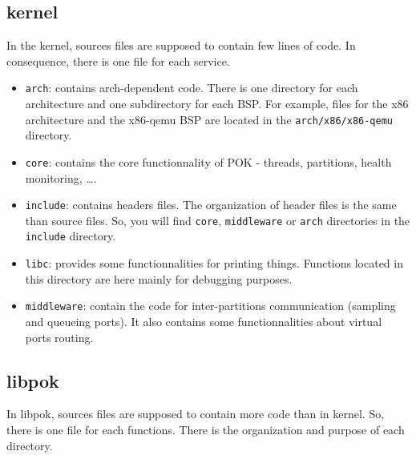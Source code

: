 \documentclass[oneside]{article}
\begin{document}
   \subsection{kernel}
   In the kernel, sources files are supposed to contain few lines of code. In
   consequence, there is one file for each service.
   \begin{itemize}
      \item
         \texttt{arch}: contains arch-dependent code. There is one directory for
         each architecture and one subdirectory for each BSP. For example, files
         for the x86 architecture and the x86-qemu BSP are located in the
         \texttt{arch/x86/x86-qemu} directory.
      \item
         \texttt{core}: contains the core functionnality of POK - threads,
         partitions, health monitoring, \ldots.
      \item
         \texttt{include}: contains headers files. The organization of header
         files is the same than source files. So, you will find \texttt{core},
         \texttt{middleware} or \texttt{arch} directories in the
         \texttt{include} directory.
      \item
         \texttt{libc}: provides some functionnalities for printing things.
         Functions located in this directory are here mainly for debugging
         purposes.
      \item
         \texttt{middleware}: contain the code for inter-partitions
         communication (sampling and queueing ports). It also contains some
         functionnalities about virtual ports routing.
   \end{itemize}

   \subsection{libpok}
   In libpok, sources files are supposed to contain more code than in kernel.
   So, there is one file for each functions. There is the organization and
   purpose of each directory.
\end{document}
